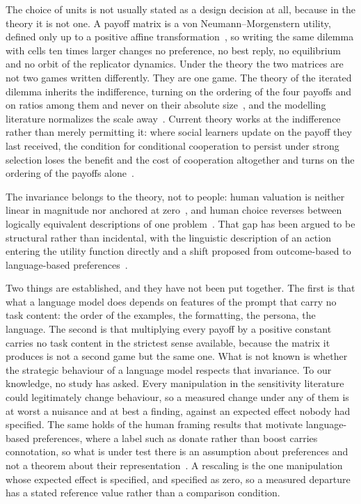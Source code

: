 \documentclass[11pt,a4paper]{article}
\begin{document}
The choice of units is not usually stated as a design decision at all, because
in the theory it is not one. A payoff matrix is a von Neumann--Morgenstern
utility, defined only up to a positive affine
transformation~\citep{vonneumann1944theory,luce1957games}, so writing the same
dilemma with cells ten times larger changes no preference, no best reply, no
equilibrium and no orbit of the replicator dynamics. Under the theory the two
matrices are not two games written differently. They are one game. The theory of
the iterated dilemma inherits the indifference, turning on the ordering of the
four payoffs and on ratios among them and never on their absolute
size~\citep{axelrod1981evolution,nowak1992tit,nowak1993strategy,press2012iterated},
and the modelling literature normalizes the scale
away~\citep{szabo2007evolutionary,perc2010coevolutionary}. Current theory works
at the indifference rather than merely permitting it: where social learners
update on the payoff they last received, the condition for conditional
cooperation to persist under strong selection loses the benefit and the cost of
cooperation altogether and turns on the ordering of the payoffs
alone~\citep{glynatsi2024evolution}.

The invariance belongs to the theory, not to people: human valuation is neither
linear in magnitude nor anchored at zero~\citep{kahneman1979prospect}, and human
choice reverses between logically equivalent descriptions of one
problem~\citep{tversky1981framing}. That gap has been argued to be structural
rather than incidental, with the linguistic description of an action entering
the utility function directly and a shift proposed from outcome-based to
language-based preferences~\citep{capraro2024language}.

Two things are established, and they have not been put together. The first is
that what a language model does depends on features of the prompt that carry
no task content: the order of the examples, the formatting, the persona, the
language. The second is that multiplying every payoff by a positive constant
carries no task content in the strictest sense available, because the matrix
it produces is not a second game but the same one. What is not known is
whether the strategic behaviour of a language model respects that invariance.
To our knowledge, no study has asked. Every manipulation in the sensitivity
literature could legitimately change behaviour, so a measured change under any
of them is at worst a nuisance and at best a finding, against an expected
effect nobody had specified. The same holds of the human framing results that
motivate language-based preferences, where a label such as donate rather than
boost carries connotation, so what is under test there is an assumption about
preferences and not a theorem about their
representation~\citep{capraro2024language}. A rescaling is the one manipulation
whose expected effect is specified, and specified as zero, so a measured
departure has a stated reference value rather than a comparison condition.
\end{document}
